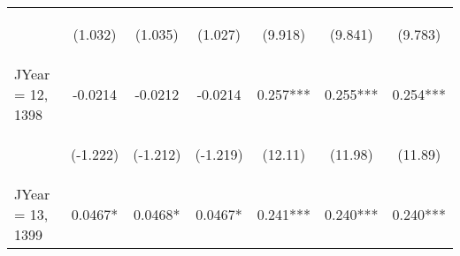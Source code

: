 \documentclass[]{article}
\begin{document}
\begin{center}
\begin{tabular}{lcccccc}
        \vspace{4pt}     & \begin{footnotesize}(1.032)\end{footnotesize}  & \begin{footnotesize}(1.035)\end{footnotesize}  & \begin{footnotesize}(1.027)\end{footnotesize}  & \begin{footnotesize}(9.918)\end{footnotesize}   & \begin{footnotesize}(9.841)\end{footnotesize}  & \begin{footnotesize}(9.783)\end{footnotesize}  \\
        JYear = 12, 1398 & -0.0214                                        & -0.0212                                        & -0.0214                                        & 0.257***                                        & 0.255***                                       & 0.254***                                       \\
        \vspace{4pt}     & \begin{footnotesize}(-1.222)\end{footnotesize} & \begin{footnotesize}(-1.212)\end{footnotesize} & \begin{footnotesize}(-1.219)\end{footnotesize} & \begin{footnotesize}(12.11)\end{footnotesize}   & \begin{footnotesize}(11.98)\end{footnotesize}  & \begin{footnotesize}(11.89)\end{footnotesize}  \\
        JYear = 13, 1399 & 0.0467*                                        & 0.0468*                                        & 0.0467*                                        & 0.241***                                        & 0.240***                                       & 0.240***                                       \\

\end{tabular}
\end{center}
\end{document}
